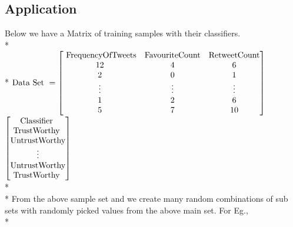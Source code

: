 \subsection{Application}
Below we have a Matrix of training samples with their classifiers. \\*\\*
$\textup{Data Set }= \begin{bmatrix}
\textup{ FrequencyOfTweets} & \textup{FavouriteCount} & \textup{RetweetCount} \\
12 & 4 & 6  \\
2 & 0  & 1 \\
\vdots & \vdots & \vdots \\
1 & 2 & 6  \\
5 & 7  & 10
\end{bmatrix}$
$\begin{bmatrix}
\textup{Classifier } \\
\textup{TrustWorthy } \\
\textup{UntrustWorthy} \\
\vdots \\
\textup{UntrustWorthy} \\
\textup{TrustWorthy } 
\end{bmatrix}$\\*\\*
From the above sample set and we create many random combinations of sub sets with randomly picked values from the above main set. For Eg., \\*

